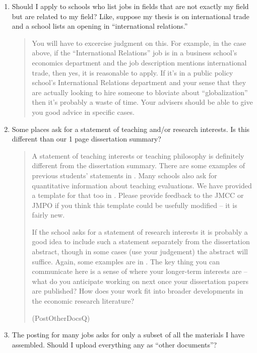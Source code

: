 \documentclass{\classes/econtex}
\providecommand\phantomsection{}
\begin{document}
\begin{enumerate}
\begin{quote}
    \end{quote}
  \item  Should I apply to schools who list jobs in fields that are not exactly my field but are related to my
    field?  Like, suppose my thesis is on international trade and a school lists
    an opening in ``international relations.''

    \begin{quote}
      You will have to excercise judgment on this.  For example, in the case
      above, if the ``International Relations'' job is in a business
      school's economics department and the job description mentions
      international trade, then yes, it is reasonable to apply.  If it's in
      a public policy school's International Relations department and your
      sense that they are actually looking to hire someone to bloviate about
      ``globalization'' then it's probably a waste of time.  Your advisers
      should be able to give you good advice in specific cases.

    \end{quote}
  \item  Some places ask for a statement of teaching and/or research
    interests.  Is this different than our 1 page
    dissertation summary?

    \begin{quote}
      A statement of teaching interests or teaching philosophy is
      definitely different from the dissertation summary.  There are some
      examples of previous students' statements in \Resources.  Many
      schools also ask for quantitative information about teaching
      evaluations.  We have provided a template for that too in
      \Templates.  Please provide feedback to the JMCC or JMPO if you
      think this template could be usefully modified -- it is fairly new.

      If the school asks for a statement of research interests it is probably
      a good idea to include such a statement separately from the dissertation
      abstract, though in some cases (use your judgement) the abstract will suffice.  Again, some examples are in \Resources.  
      The key thing you can communicate here is a sense of where your longer-term 
      interests are -- what do you anticipate working on next once your dissertation
      papers are published?  How does your work fit into broader developments in 
      the economic research literature?

      \ifdvi\phantomsection\hypertarget{PostOtherDocsQ}{(PostOtherDocsQ)}\fi
    \end{quote}
  \item  The {\JOE} posting for many jobs asks for only a subset of all the materials I have assembled.  Should I upload everything any as ``other documents''?


\end{enumerate}
\end{document}
